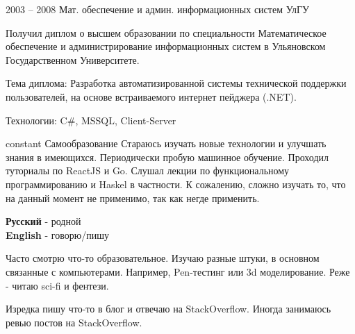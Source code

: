 \documentclass[10pt]{tpl/developercv} %
\begin{document}

\begin{entrylist}
	\entry
		{2003 -- 2008}
		{Мат. обеспечение и админ. информационных систем}
		{УлГУ}
		{Получил диплом о высшем образовании по специальности Математическое обеспечение и администрирование информационных систем в Ульяновском Государственном Университете.

		Тема диплома: Разработка автоматизированной системы технической поддержки пользователей, на основе встраиваемого интернет пейджера (.NET).

		Технологии: C\#, MSSQL, Client-Server
		}
	\entry
		{constant}
		{Самообразование}
		{}
		{Стараюсь изучать новые технологии и улучшать знания в имеющихся. Периодически пробую машинное обучение. Проходил туториалы по ReactJS и Go. Слушал лекции по функциональному программированию и Haskel в частности. К сожалению, сложно изучать то, что на данный момент не применимо, так как негде применить. }
\end{entrylist}


\begin{minipage}[t]{0.3\textwidth}
	\vspace{-\baselineskip} %


	\textbf{Русский} - родной\\
	\textbf{English} - говорю/пишу\\
\end{minipage}
\hfill
\begin{minipage}[t]{0.3\textwidth}
	\vspace{-\baselineskip} %


	Часто смотрю что-то образовательное. Изучаю разные штуки, в основном связанные с компьютерами. Например, Pen-тестинг или 3d моделирование.
	Реже - читаю sci-fi и фентези.
\end{minipage}
\hfill
\begin{minipage}[t]{0.3\textwidth}
	\vspace{-\baselineskip} %


	Изредка пишу что-то в блог и отвечаю на StackOverflow. Иногда занимаюсь ревью постов на StackOverflow.
\end{minipage}
\end{document}
